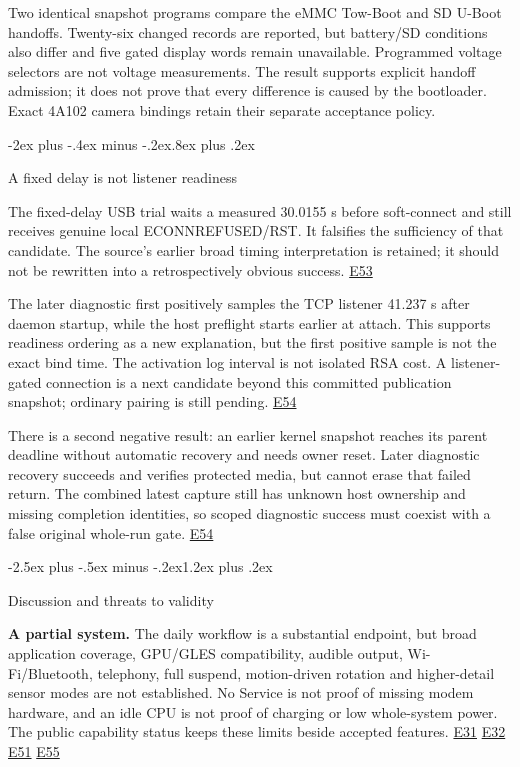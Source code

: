 \documentclass[10pt,letterpaper,twocolumn]{article}
\makeatletter
\renewcommand{\section}{\@startsection{section}{1}{0pt}
  {-2.5ex plus -.5ex minus -.2ex}{1.2ex plus .2ex}
  {\normalfont\large\bfseries\raggedright}}
\renewcommand{\subsection}{\@startsection{subsection}{2}{0pt}
  {-2ex plus -.4ex minus -.2ex}{.8ex plus .2ex}
  {\normalfont\normalsize\bfseries\raggedright}}
\makeatother
\begin{document}
Two identical snapshot programs compare the eMMC Tow-Boot and SD U-Boot handoffs. Twenty-six changed records are reported, but battery/SD conditions also differ and five gated display words remain unavailable. Programmed voltage selectors are not voltage measurements. The result supports explicit handoff admission; it does not prove that every difference is caused by the bootloader. Exact 4A102 camera bindings retain their separate acceptance policy.

\subsection{A fixed delay is not listener readiness}

The fixed-delay USB trial waits a measured 30.0155 s before soft-connect and still receives genuine local ECONNREFUSED/RST. It falsifies the sufficiency of that candidate. The source's earlier broad timing interpretation is retained; it should not be rewritten into a retrospectively obvious success. \hyperlink{e-E53}{\textsf{E53}}

The later diagnostic first positively samples the TCP listener 41.237 s after daemon startup, while the host preflight starts earlier at attach. This supports readiness ordering as a new explanation, but the first positive sample is not the exact bind time. The activation log interval is not isolated RSA cost. A listener-gated connection is a next candidate beyond this committed publication snapshot; ordinary pairing is still pending. \hyperlink{e-E54}{\textsf{E54}}

There is a second negative result: an earlier kernel snapshot reaches its parent deadline without automatic recovery and needs owner reset. Later diagnostic recovery succeeds and verifies protected media, but cannot erase that failed return. The combined latest capture still has unknown host ownership and missing completion identities, so scoped diagnostic success must coexist with a false original whole-run gate. \hyperlink{e-E54}{\textsf{E54}}

\section{Discussion and threats to validity}

\textbf{A partial system.} The daily workflow is a substantial endpoint, but broad application coverage, GPU/GLES compatibility, audible output, Wi-Fi/Bluetooth, telephony, full suspend, motion-driven rotation and higher-detail sensor modes are not established. No Service is not proof of missing modem hardware, and an idle CPU is not proof of charging or low whole-system power. The public capability status keeps these limits beside accepted features. \hyperlink{e-E31}{\textsf{E31}} \hyperlink{e-E32}{\textsf{E32}} \hyperlink{e-E51}{\textsf{E51}} \hyperlink{e-E55}{\textsf{E55}}
\end{document}
